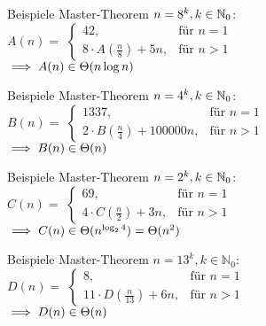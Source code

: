 \begin{frame}{Beispiele Master-Theorem}
	$n = 8^k, k \in \mathbb{N}_0$: \\[.5\baselineskip]
	$A(n) = $
	\begin{math}
		\begin{cases}
		42,                           & \text{für } n = 1 \\
		8 \cdot A(\frac{n}{8}) + 5n,  & \text{für } n > 1
		\end{cases}
	\end{math} \\[.5\baselineskip]
	\pause
	$\Impl A(n) \in \Theta(n\log n)$
\end{frame}



\begin{frame}{Beispiele Master-Theorem}
	$n = 4^k, k \in \mathbb{N}_0$: \\[.5\baselineskip]
	$B(n) = $
	\begin{math}
		\begin{cases}
		1337,                              & \text{für } n = 1 \\
		2 \cdot B(\frac{n}{4}) + 100000n,  & \text{für } n > 1
		\end{cases}
	\end{math} \\[.5\baselineskip]
	\pause
	$\Impl B(n) \in \Theta(n)$
\end{frame}


\begin{frame}{Beispiele Master-Theorem}
	$n = 2^k, k \in \mathbb{N}_0$: \\[0,25cm]
	$C(n) = $
	\begin{math}
		\begin{cases}
		69,                           & \text{für } n = 1 \\
		4 \cdot C(\frac{n}{2}) + 3n,  & \text{für } n > 1
		\end{cases}
	\end{math} \\[0,5cm]
	\pause
	$\Impl C(n) \in \Theta(n^{\log _{2}4}) = \Theta(n^2)$
\end{frame}


\begin{frame}{Beispiele Master-Theorem}
	$n = 13^k, k \in \mathbb{N}_0$: \\[0,25cm]
	$D(n) = $
	\begin{math}
		\begin{cases}
		8,                              & \text{für } n = 1 \\
		11 \cdot D(\frac{n}{13}) + 6n,  & \text{für } n > 1
		\end{cases}
	\end{math} \\[0,5cm]
	\pause
	$\Impl D(n) \in \Theta(n)$
\end{frame}


